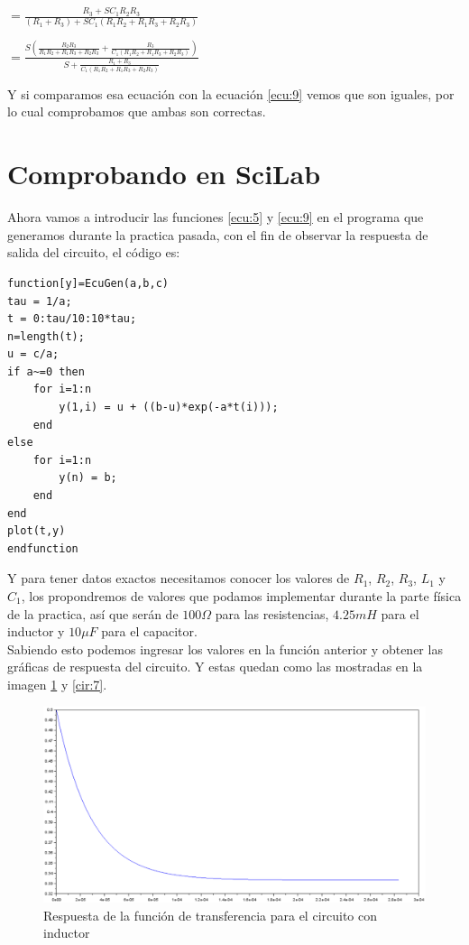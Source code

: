 \documentclass[letterpaper,spanish,12pt]{report}
\begin{document}
	\begin{center}$= \frac{R_{3}+SC_{1}R_{2}R_{3}}{(R_{1}+R_{3})+SC_{1}(R_{1}R_{2}+R_{1}R_{3}+R_{2}R_{3})}$\end{center}

	\begin{center}$= \frac{S(\frac{R_{2}R_{3}}{R_{1}R_{2}+R_{1}R_{3}+R_{2}R_{3}} + \frac{R_{3}}{C_{1}(R_{1}R_{2}+R_{1}R_{3}+R_{2}R_{3})})}{S + \frac{R_{1}+R_{3}}{C_{1}(R_{1}R_{2}+R_{1}R_{3}+R_{2}R_{3})}}$\end{center}

Y si comparamos esa ecuaci\'on con la ecuaci\'on \ref{ecu:9} vemos que son iguales, por lo cual comprobamos que ambas son correctas.

	\section{Comprobando en SciLab}

Ahora vamos a introducir las funciones \ref{ecu:5} y \ref{ecu:9} en el programa que generamos durante la practica pasada, con el fin de observar la respuesta de salida del circuito, el c\'odigo es:

\begin{verbatim}
function[y]=EcuGen(a,b,c)
tau = 1/a;
t = 0:tau/10:10*tau;
n=length(t);
u = c/a;
if a~=0 then
    for i=1:n
        y(1,i) = u + ((b-u)*exp(-a*t(i)));
    end
else
    for i=1:n
        y(n) = b;
    end
end
plot(t,y)
endfunction
\end{verbatim}

Y para tener datos exactos necesitamos conocer los valores de $R_{1}$, $R_{2}$, $R_{3}$, $L_{1}$ y $C_{1}$, los propondremos de valores que podamos implementar durante la parte f\'isica de la practica, as\'i que ser\'an de $100\Omega$ para las resistencias, $4.25mH$ para el inductor y $10\mu F$ para el capacitor.\\ \medskip Sabiendo esto podemos ingresar los valores en la funci\'on anterior y obtener las gr\'aficas de respuesta del circuito. Y estas quedan como las mostradas en la imagen \ref{cir:6} y \ref{cir:7}.

\begin{figure}[h]
	\centering
		\includegraphics[width=1.00\textwidth]{FormadeondaL.eps}
	\caption{Respuesta de la funci\'on de transferencia para el circuito con inductor}
	\label{cir:6}
\end{figure}
\end{document}
